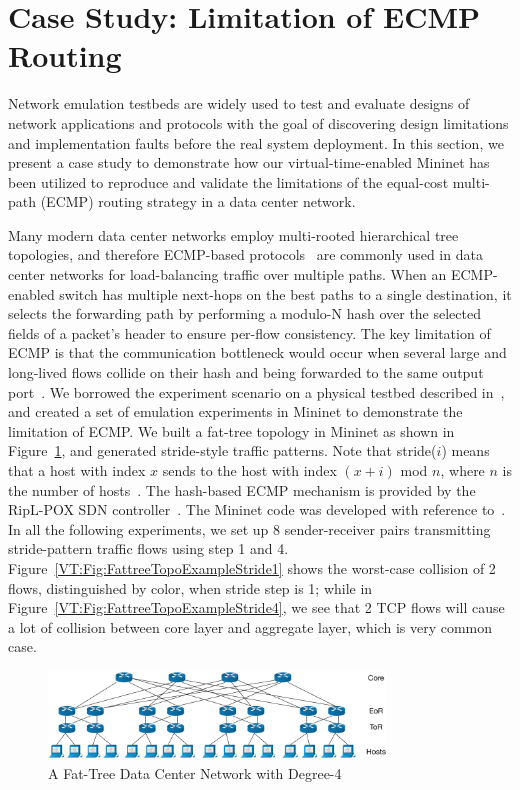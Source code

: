 \section{Case Study: Limitation of ECMP Routing}
\label{VT:Sec:CaseStudy}
Network emulation testbeds are widely used to test and evaluate designs of network applications and
protocols with the goal of discovering design limitations and implementation faults before the real system deployment.
In this section, we present a case study to demonstrate how our virtual-time-enabled Mininet has been utilized to
reproduce and validate the limitations of the equal-cost multi-path (ECMP) routing strategy in a data center network.

Many modern data center networks employ multi-rooted hierarchical tree topologies,
and therefore ECMP-based protocols~\cite{ECMP} are commonly used in data center networks for load-balancing traffic over multiple paths.
When an ECMP-enabled switch has multiple next-hops on the best paths to a single destination,
it selects the forwarding path by performing a modulo-N hash over the selected fields of a packet's header to ensure per-flow consistency.
The key limitation of ECMP is that the communication bottleneck would occur when several large and
long-lived flows collide on their hash and being forwarded to the same output port~\cite{Hedera}. 
We borrowed the experiment scenario on a physical testbed described in~\cite{Hedera},
and created a set of emulation experiments in Mininet to demonstrate the limitation of ECMP.
We built a fat-tree topology in Mininet as shown in Figure~\ref{VT:Fig:FattreeTopoExample},
and generated stride-style traffic patterns. Note that stride($i$) means that a host with index $x$ sends to the host with index $(x + i)$ mod $n$,
where $n$ is the number of hosts~\cite{Hedera}. 
The hash-based ECMP mechanism is provided by the RipL-POX SDN controller~\cite{RipLPox}.
The Mininet code was developed with reference to~\cite{ReproNetReserch}.
In all the following experiments, we set up 8 sender-receiver pairs transmitting stride-pattern traffic flows using step 1 and 4.
Figure~\ref{VT:Fig:FattreeTopoExampleStride1} shows the worst-case collision of 2 flows, distinguished by color, when stride step is 1;
while in Figure~\ref{VT:Fig:FattreeTopoExampleStride4}, we see that 2 TCP flows will cause a lot of collision between core layer and aggregate layer,
which is very common case.

\begin{figure}[ht]
\centering
\includegraphics[width=0.8\textwidth]{VirtualTime/figures/TopoFatTreeExample.eps}
\caption{A Fat-Tree Data Center Network with Degree-4}
\label{VT:Fig:FattreeTopoExample}
\end{figure}

